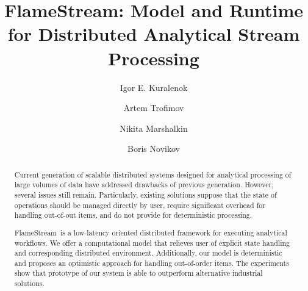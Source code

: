 \documentclass[sigconf]{acmart}
\theoremstyle{remark}
\newcommand {\FlameStream} {FlameStream}
\begin{document}
\title {\FlameStream: Model and Runtime for Distributed Analytical Stream Processing}


\author{Igor E. Kuralenok}

\author{Artem Trofimov}

\author{Nikita Marshalkin}

\author{Boris Novikov}




\begin{abstract}
Current generation of scalable distributed systems designed for analytical processing of large volumes of data have addressed drawbacks of previous generation. However, several issues still remain. Particularly, existing solutions suppose that the state of operations should be managed directly by user, require significant overhead for handling out-of-out items, and do not provide for deterministic processing.

\FlameStream\ is a low-latency oriented distributed framework for executing analytical workflows. We offer a computational model that relieves user of explicit state handling and corresponding distributed environment. Additionally, our model is deterministic and proposes an optimistic approach for handling out-of-order items. The experiments show that prototype of our system is able to outperform alternative industrial solutions.
\end {abstract}
\end{document}
